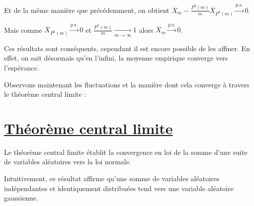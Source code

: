 \documentclass{article}
\begin{document}
\noindent
Et de la même manière que précédemment, on obtient $\overline{X}_m - \frac{P^2(m)}{m} \overline{X}_{P^2(m)} \xrightarrow{\text{p.s.}} 0$.

\vspace{0,3cm}
\noindent
Mais comme $\overline{X}_{P^2(m)} \xrightarrow{\text{p.s.}} 0$ et $\frac{P^2(m)}{m} \xrightarrow[m \to \infty]{} 1$ alors $\overline{X}_m \xrightarrow{\text{p.s.}} 0$.

\vspace{0,3cm}
\noindent
Ces résultats sont conséquents, cependant il est encore possible de les affiner.  
En effet, on sait désormais qu'en l'infini, la moyenne empirique converge vers l'espérance.




\vspace{1cm}


\vspace{1cm}
Observons maintenant les fluctuations et la manière dont cela converge à travers le théorème central limite :

\section*{\underline{Théorème central limite}}


Le théorème central limite établit la convergence en loi de la somme d'une suite de variables aléatoires vers la loi normale.  

\vspace{0.3cm}
\noindent
Intuitivement, ce résultat affirme qu'une somme de variables aléatoires indépendantes et identiquement distribuées tend vers une variable aléatoire gaussienne.
\end{document}
